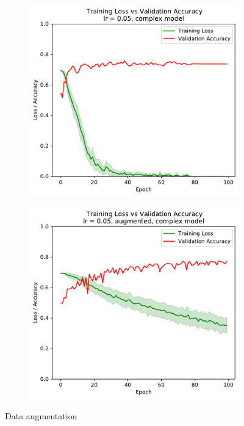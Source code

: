 \documentclass[sigconf,nonacm]{acmart}
\begin{document}
\begin{figure}[ht]
\begin{subfigure}[c]{0.45\columnwidth}
\includegraphics[width=\textwidth]{plot_complex_0_05.pdf}
\end{subfigure}
\begin{subfigure}[c]{0.45\columnwidth}
\includegraphics[width=\textwidth]{plot_augmented_complex_0_05.pdf}
\end{subfigure}
\caption{Data augmentation}
\label{part2:augmentation}
\end{figure}
  
\end{document}
